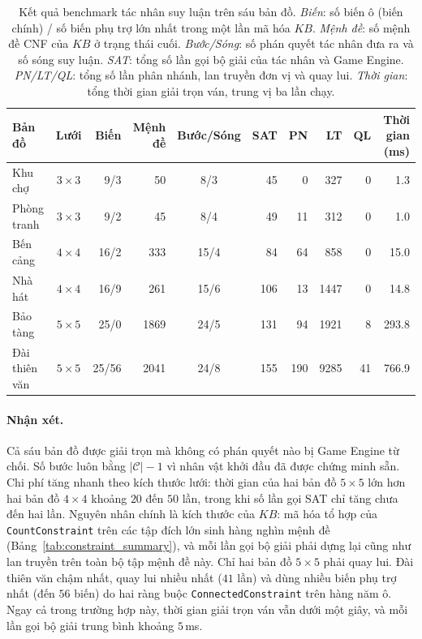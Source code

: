 \begin{table}[htbp]
  \centering\small
  \setlength{\tabcolsep}{4pt}
  \caption{Kết quả benchmark tác nhân suy luận trên sáu bản đồ. \emph{Biến}:
    số biến ô (biến chính) / số biến phụ trợ lớn nhất trong một lần mã hóa
    $\mathit{KB}$. \emph{Mệnh đề}: số mệnh đề CNF của $\mathit{KB}$ ở trạng
    thái cuối. \emph{Bước/Sóng}: số phán quyết tác nhân đưa ra và số sóng suy
    luận. \emph{SAT}: tổng số lần gọi bộ giải của tác nhân và Game Engine.
    \emph{PN/LT/QL}: tổng số lần phân nhánh, lan truyền đơn vị và quay lui.
    \emph{Thời gian}: tổng thời gian giải trọn ván, trung vị ba lần chạy.}
  \label{tab:benchmark_raw}
  \begin{tabular}{lcrrcrrrrr}
    \toprule
    \textbf{Bản đồ} & \textbf{Lưới} & \textbf{Biến} & \textbf{Mệnh đề}
      & \textbf{Bước/Sóng} & \textbf{SAT} & \textbf{PN} & \textbf{LT}
      & \textbf{QL} & \textbf{Thời gian (ms)} \\
    \midrule
    Khu chợ       & $3\times3$ & 9/3   &   50 & 8/3  &  45 &   0 &  327 &  0 &   1.3 \\
    Phòng tranh   & $3\times3$ & 9/2   &   45 & 8/4  &  49 &  11 &  312 &  0 &   1.0 \\
    Bến cảng      & $4\times4$ & 16/2  &  333 & 15/4 &  84 &  64 &  858 &  0 &  15.0 \\
    Nhà hát       & $4\times4$ & 16/9  &  261 & 15/6 & 106 &  13 & 1447 &  0 &  14.8 \\
    Bảo tàng      & $5\times5$ & 25/0  & 1869 & 24/5 & 131 &  94 & 1921 &  8 & 293.8 \\
    Đài thiên văn & $5\times5$ & 25/56 & 2041 & 24/8 & 155 & 190 & 9285 & 41 & 766.9 \\
    \bottomrule
  \end{tabular}
\end{table}

\paragraph{Nhận xét.}
Cả sáu bản đồ được giải trọn mà không có phán quyết nào bị Game Engine từ chối.
Số bước luôn bằng $|\mathcal{C}|-1$ vì nhân vật khởi đầu đã được chứng minh sẵn.
Chi phí tăng nhanh theo kích thước lưới: thời gian của hai bản đồ $5\times5$
lớn hơn hai bản đồ $4\times4$ khoảng $20$ đến $50$ lần, trong khi số lần gọi
SAT chỉ tăng chưa đến hai lần. Nguyên nhân chính là kích thước của
$\mathit{KB}$: mã hóa tổ hợp của \texttt{CountConstraint} trên các tập đích
lớn sinh hàng nghìn mệnh đề (Bảng~\ref{tab:constraint_summary}), và mỗi lần
gọi bộ giải phải dựng lại cũng như lan truyền trên toàn bộ tập mệnh đề này.
Chỉ hai bản đồ $5\times5$ phải quay lui. Đài thiên văn chậm nhất, quay lui
nhiều nhất ($41$ lần) và dùng nhiều biến phụ trợ nhất (đến $56$ biến) do hai ràng buộc
\texttt{ConnectedConstraint} trên hàng năm ô. Ngay cả trong trường hợp này,
thời gian giải trọn ván vẫn dưới một giây, và mỗi lần gọi bộ giải trung bình
khoảng $5$\,ms.

